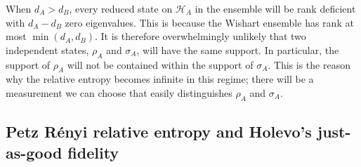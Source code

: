 \documentclass[a4paper,11pt]{article}
\begin{document}
When $d_A > d_B$, every reduced state on $\mathcal{H}_A$ in the ensemble will be rank deficient with $d_A - d_B$ zero eigenvalues. This is because the Wishart ensemble has rank at most $\min(d_A,d_B)$. It is therefore overwhelmingly unlikely that two independent states, $\rho_A$ and $\sigma_A$, will have the same support. In particular, the support of $\rho_A$ will not be contained within the support of $\sigma_A$. This is the reason why the relative entropy becomes infinite in this regime; there will be a measurement we can choose that easily distinguishes $\rho_A$ and $\sigma_A$. 

\subsection{Petz R\'enyi relative entropy and Holevo's just-as-good fidelity}
\label{PRRE_sec}
\end{document}
